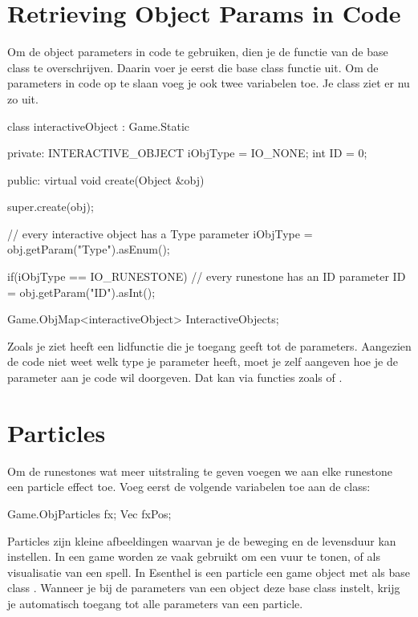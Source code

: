 \section{Retrieving Object Params in Code}

Om de object parameters in code te gebruiken, dien je de functie  van de base class  te overschrijven. Daarin voer je eerst die base class functie uit. Om de parameters in code op te slaan voeg je ook twee variabelen toe. Je class ziet er nu zo uit.

\begin{code}
class interactiveObject : Game.Static
{
private:
   INTERACTIVE_OBJECT iObjType = IO_NONE;
   int ID = 0;
   
public:   
   virtual void create(Object &obj)
   {
      super.create(obj);
      
      // every interactive object has a Type parameter
      iObjType = obj.getParam("Type").asEnum();
      
      if(iObjType == IO_RUNESTONE)
      {
         // every runestone has an ID parameter
         ID = obj.getParam("ID").asInt();
      }
   }
}

Game.ObjMap<interactiveObject> InteractiveObjects;
\end{code}

Zoals je ziet heeft  een lidfunctie  die je toegang geeft tot de parameters. Aangezien de code niet weet welk type je parameter heeft, moet je zelf aangeven hoe je de parameter aan je code wil doorgeven. Dat kan via functies zoals  of .

\section{Particles}
Om de runestones wat meer uitstraling te geven voegen we aan elke runestone een particle effect toe. Voeg eerst de volgende variabelen toe aan de  class:

\begin{code}
Game.ObjParticles fx;
Vec fxPos;
\end{code}

Particles zijn kleine afbeeldingen waarvan je de beweging en de levensduur kan instellen. In een game worden ze vaak gebruikt om een vuur te tonen, of als visualisatie van een spell. In Esenthel is een particle een game object met als base class . Wanneer je bij de parameters van een object deze base class instelt, krijg je automatisch toegang tot alle parameters van een particle.

